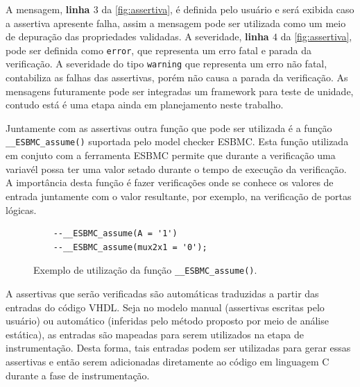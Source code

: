 \par
A mensagem, \textbf{linha $3$} da \autoref{fig:assertiva}, é definida pelo usuário e será exibida caso a assertiva apresente falha, assim a mensagem pode ser utilizada como um meio de depuração das propriedades validadas. A severidade, \textbf{linha $4$} da \autoref{fig:assertiva}, pode ser definida como \texttt{error}, que representa um erro fatal e parada da verificação. A severidade do tipo \texttt{warning} que representa um erro não fatal, contabiliza as falhas das assertivas, porém não causa a parada da verificação. As mensagens futuramente pode ser integradas um framework para teste de unidade, contudo está é uma etapa ainda em planejamento neste trabalho.

\par
Juntamente com as assertivas outra função que pode ser utilizada é a função \texttt{\_\_ESBMC\allowbreak{}\_assume()} suportada pelo model checker ESBMC. Esta função utilizada em conjuto com a ferramenta ESBMC permite que durante a verificação uma variavél possa ter uma valor setado durante o tempo de execução da verificação. A importância desta função é fazer verificações onde se conhece os valores de entrada juntamente com o valor resultante, por exemplo, na verificação de portas lógicas.

\begin{figure}[H]
\caption{\label{fig:assertiva_assume} Exemplo de utilização da função \texttt{\_\_ESBMC\_assume()}.}
	\begin{center}
    \begin{minipage}{0.99\textwidth}
    \begin{lstlisting}       
    --__ESBMC_assume(A = '1')
    --__ESBMC_assume(mux2x1 = '0');
    \end{lstlisting}
    \end{minipage}
	\end{center}
\end{figure}

\par
A assertivas que serão verificadas são automáticas traduzidas a partir das entradas do código VHDL. Seja no modelo manual (assertivas escritas pelo usuário) ou automático (inferidas pelo método proposto por meio de análise estática), as entradas são mapeadas para serem utilizados na etapa de instrumentação. Desta forma, tais entradas podem ser utilizadas para gerar essas assertivas e então serem adicionadas diretamente ao código em linguagem C durante a fase de instrumentação.

